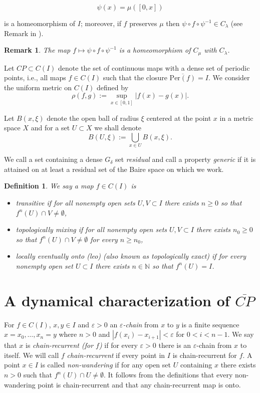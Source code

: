 \documentclass[12pt, a4paper]{amsart}
\newtheorem{remark}[theorem]{Remark}
\newtheorem{definition}[theorem]{Definition}
\def\eps{\varepsilon}
\def\ge{\geqslant}
\def\per{\mathrm{Per}}
\newcommand{\?}{{\bf ???}}
\begin{document}
$$\psi(x)=\mu([0,x])$$ 

is a homeomorphism of $I$; moreover, if $f$ preserves $\mu$ then $\psi\circ f\circ \psi^{-1}\in C_{\lambda}$ (see Remark in \cite{BCOT}). 

\begin{remark}\label{rem:psihomeo}
 The map $f\mapsto \psi\circ f\circ \psi^{-1}$ is a homeomorphism of $C_{\mu}$ with $C_{\lambda}$.
\end{remark}

Let $CP \subset C(I)$ denote the set of continuous maps with a dense set of periodic points, i.e., all maps $f\in C(I)$ such that the closure $\overline{\per(f)}=I$.
We consider the uniform metric on $C(I)$ defined by 
$$\rho (f,g) := \sup_{x \in [0,1]} |f(x) - g(x)|.$$

Let $B(x,\xi)$  denote the open ball of radius $\xi$ centered at the point $x$ in a metric space $X$ and for a set $U\subset X$ we shall denote 
$$B(U,\xi):=\bigcup_{x\in U}B(x,\xi).$$

We call a set containing a dense $G_{\delta}$ set {\em residual} and call a property {\em generic} if it is attained on at least a residual set of the Baire space on which we work.


 \begin{definition}
 We say a map $f\in C(I)$ is
\begin{itemize}
	\item {\em transitive} if for all nonempty open sets $U,V\subset I$ there exists $n\ge 0$ so that $f^n(U)\cap V\neq\emptyset$,
	\item {\em topologically mixing} if for all nonempty open sets $U,V\subset I$ there exists $n_0\geq0$ so that $f^n(U)\cap V\neq\emptyset$ for every $n\ge
	n_0$,
	\item   {\em locally eventually onto (leo)} (also known as {\em topologically exact}) if for every nonempty open set $U\subset I$ there exists $n\in{\mathbb N}$ so that $f^n(U)=I$.
\end{itemize}
\end{definition}


\section{A dynamical characterization of $\overline{CP}$}\label{sec:characterizationCP}
 For $f \in C(I)$, $x, y \in I$ and $\eps>0$ an \textit{$\eps$-chain} from $x$ to $y$ is a finite sequence
$x = x_0,\ldots, x_n = y$ where $n>0$ and $|f(x_i)-x_{i+1}| < \eps$ for $0<i< n-1$. We say
that $x$ is \textit{chain-recurrent (for $f$)} if for every $\eps>0$ there is an $\eps$-chain from $x$ to itself. We will call $f$ {\it chain-recurrent} if every point in $I$ is chain-recurrent for $f$. A point $x\in I$ is called {\it non-wandering} if for any open set $U$ containing $x$  there exists $n>0$ such that $f^n(U)\cap U\neq \emptyset$.  It follows from the definitions that every non-wandering point is chain-recurrent and that any chain-recurrent map is onto.  
\end{document}
